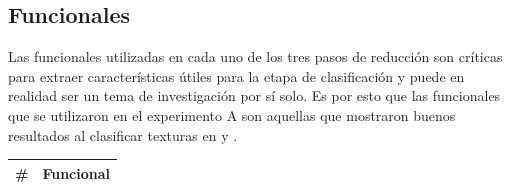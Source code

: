 

\subsection{Funcionales}

Las funcionales utilizadas en cada uno de los tres pasos de reducción son críticas para extraer características útiles para la etapa de clasificación y puede en realidad ser un tema de investigación por sí solo. Es por esto que las funcionales que se utilizaron en el experimento A son aquellas que mostraron buenos resultados al clasificar texturas en \cite{Petrou2007} y \cite{Tutorial2008}.\\

\begin{longtable}{ |c|l| }
        \hline 
        \textbf{\#} & \textbf{Funcional} \\
        \hline 
        \endhead
        

\end{longtable}

